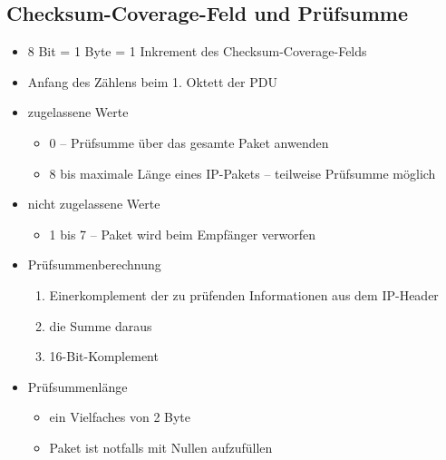 \documentclass{beamer}
\begin{document}
\subsection{Checksum-Coverage-Feld und Prüfsumme}
\begin{frame}
\begin{itemize}
\item 8 Bit = 1 Byte = 1 Inkrement des Checksum-Coverage-Felds
\item Anfang des Zählens beim 1. Oktett der PDU
\item zugelassene Werte
	\begin{itemize}
	\item 0 -- Prüfsumme über das gesamte Paket anwenden
	\item $ 8 $ bis maximale Länge eines IP-Pakets -- teilweise Prüfsumme möglich
	\end{itemize}
\item nicht zugelassene Werte
	\begin{itemize}
	\item 1 bis 7 -- Paket wird beim Empfänger verworfen
	\end{itemize}
\item Prüfsummenberechnung
	\begin{enumerate}
	\item Einerkomplement der zu prüfenden Informationen aus dem IP-Header
	\item die Summe daraus
	\item 16-Bit-Komplement
	\end{enumerate}
	\item Prüfsummenlänge
		\begin{itemize}
		\item ein Vielfaches von 2 Byte
		\item Paket ist notfalls mit Nullen aufzufüllen
		\end{itemize}
\end{itemize}
\end{frame}

\end{document}
